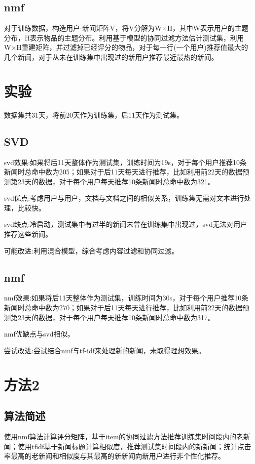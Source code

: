 \documentclass[UTF8]{article}
\begin{document}
\subsection{nmf}
对于训练数据，构造用户-新闻矩阵V，将V分解为W×H，其中W表示用户的主题分布，H表示物品的主题分布。利用基于模型的协同过滤方法估计测试集，利用W×H重建矩阵，并过滤掉已经评分的物品，对于每一行(一个用户)推荐值最大的几个新闻，对于从未在训练集中出现过的新用户推荐最近最热的新闻。
\section{实验}
数据集共31天，将前20天作为训练集，后11天作为测试集。
\subsection{SVD}

svd效果:如果将后11天整体作为测试集，训练时间为19s，对于每个用户推荐10条新闻时总命中数为205；如果对于后11天每天进行推荐，比如利用前22天的数据预测第23天的数据，对于每个用户每天推荐10条新闻时总命中数为321。

svd优点:考虑用户与用户，文档与文档之间的相似关系，训练集无需对文本进行处理，比较快。

svd缺点:冷启动，测试集中有过半的新闻未曾在训练集中出现过，svd无法对用户推荐这些新闻。

可能改进:利用混合模型，综合考虑内容过滤和协同过滤。
\subsection{nmf}
nmf效果:如果将后11天整体作为测试集，训练时间为30s，对于每个用户推荐10条新闻时总命中数为270；如果对于后11天每天进行推荐，比如利用前22天的数据预测第23天的数据，对于每个用户每天推荐10条新闻时总命中数为317。

nmf优缺点与svd相似。

尝试改进:尝试结合nmf与tf-idf来处理新的新闻，未取得理想效果。

\section{方法2}
\subsection{算法简述}
使用nmf算法计算评分矩阵，基于item的协同过滤方法推荐训练集时间段内的老新闻；使用tfidf基于新闻标题计算相似度，推荐测试集时间段内的新新闻；统计点击率最高的老新闻和相似度与其最高的新新闻向新用户进行非个性化推荐。
\end{document}
